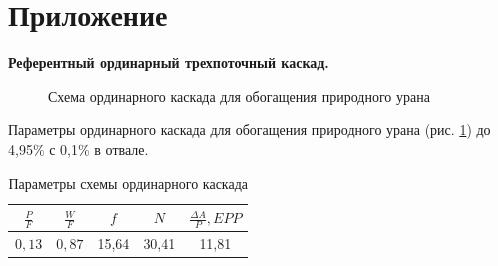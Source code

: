 \chapter*{Приложение}             %
\noindent

\renewcommand{\thefigure}{A\arabic{figure}}
\setcounter{figure}{0}
\renewcommand{\thetable}{A\arabic{figure}}
\setcounter{table}{0}

\textbf{Референтный ординарный трехпоточный каскад.}

\begin{figure}[ht]
  \caption{Схема ординарного каскада для обогащения природного урана}\label{uranfN}
\end{figure}

Параметры ординарного каскада для обогащения природного урана (рис. \ref{uranfN}) до 4,95\% с 0,1\% в отвале.

\begin{table}[ht]
    \centering
    \normalsize\begin{tabulary}{1.0\textwidth}{|c|c|c|c|c|}
        \hline $\frac{P}{F}$ & $\frac{W}{F}$ & $f$ & $N$ & $\frac{\Delta A}{P}, EPP$\\
        \hline $0,13$ & $0,87$ & 15,64 & 30,41 & 11,81\\\hline
    \end{tabulary}
\caption{Параметры схемы ординарного каскада}\label{ordninary495}
\end{table}















